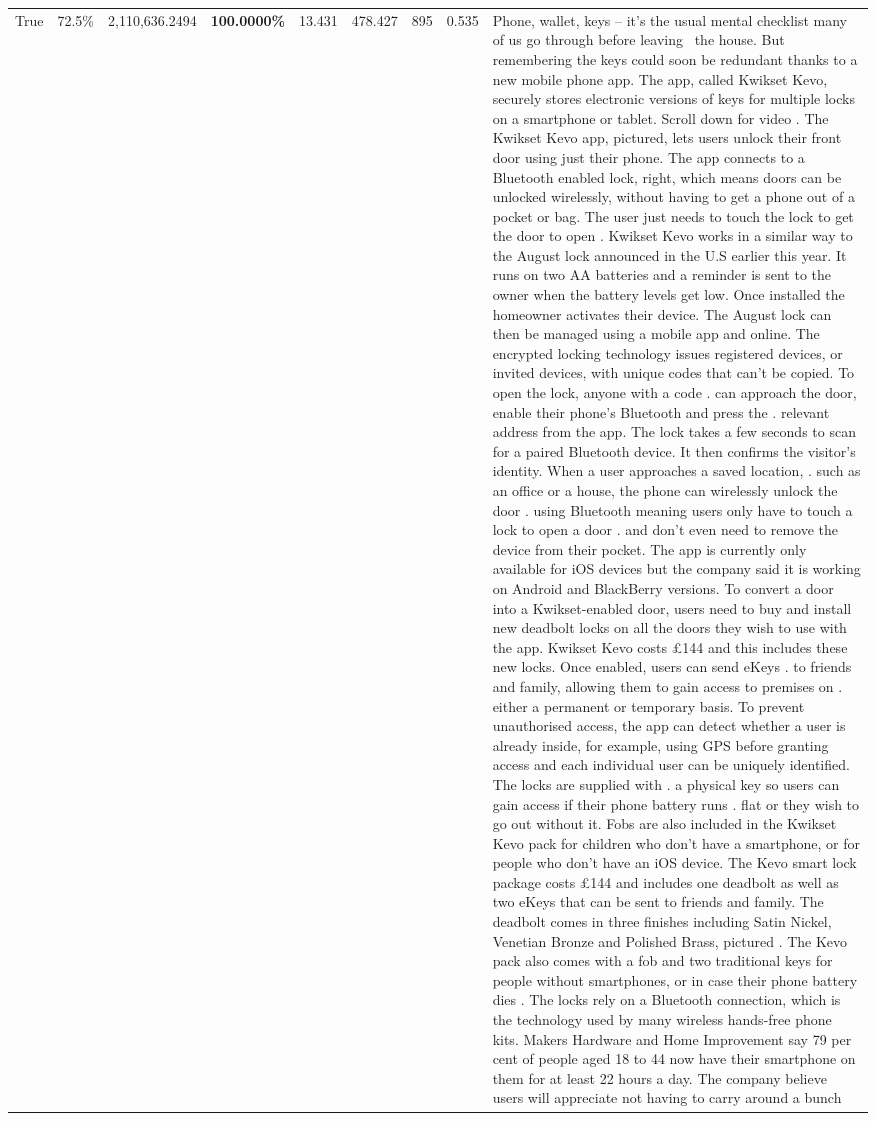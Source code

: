 \begin{table}[H]
\begin{tabular}{lllrlllll}
True & 72.5\% & 2,110,636.2494 & \bfseries \color{red} 100.0000\% & 13.431 & 478.427 & 895 & 0.535 & Phone, wallet, keys – it’s the usual mental checklist many of us go through before leaving  the house. But remembering the keys could soon be redundant thanks to a new mobile phone app. The app, called Kwikset Kevo, securely stores electronic versions of keys for multiple locks on a smartphone or tablet. Scroll down for video . The Kwikset Kevo app, pictured, lets users unlock their front door using just their phone. The app connects to a Bluetooth enabled lock, right, which means doors can be unlocked wirelessly, without having to get a phone out of a pocket or bag. The user just needs to touch the lock to get the door to open . Kwikset Kevo works in a similar way to the August lock announced in the U.S earlier this year. It runs on two AA batteries and a reminder is sent to the owner when the battery levels get low. Once installed the homeowner activates their device. The August lock can then be managed using a mobile app and online. The encrypted locking technology issues registered devices, or invited devices, with unique codes that can't be copied. To open the lock, anyone with a code . can approach the door, enable their phone's Bluetooth and press the . relevant address from the app. The lock takes a few seconds to scan for a paired Bluetooth device. It then confirms the visitor's identity. When a user approaches a saved location, . such as an office or a house, the phone can wirelessly unlock the door . using Bluetooth meaning users only have to touch a lock to open a door . and don't even need to remove the device from their pocket. The app is currently only available for iOS devices but the company said it is working on Android and BlackBerry versions. To convert a door into a Kwikset-enabled door, users need to buy and install new deadbolt locks on all the doors they wish to use with the app. Kwikset Kevo costs £144 and this includes these new locks. Once enabled, users can send eKeys . to friends and family, allowing them to gain access to premises on . either a permanent or temporary basis. To prevent unauthorised access, the app can detect whether a user is already inside, for example, using GPS before granting access and each individual user can be uniquely identified. The locks are supplied with . a physical key so users can gain access if their phone battery runs . flat or they wish to go out without it. Fobs are also included in the Kwikset Kevo pack for children who don't have a smartphone, or for people who don't have an iOS device. The Kevo smart lock package costs £144 and includes one deadbolt as well as two eKeys that can be sent to friends and family. The deadbolt comes in three finishes including Satin Nickel, Venetian Bronze and Polished Brass, pictured . The Kevo pack also comes with a fob and two traditional keys for people without smartphones, or in case their phone battery dies . The locks rely on a Bluetooth connection, which is the technology used by many wireless hands-free phone kits. Makers Hardware and Home Improvement say 79 per cent of people aged 18 to 44 now have their smartphone on them for at least 22 hours a day. The company believe users will appreciate not having to carry around a bunch 
\end{tabular}
\end{table}
